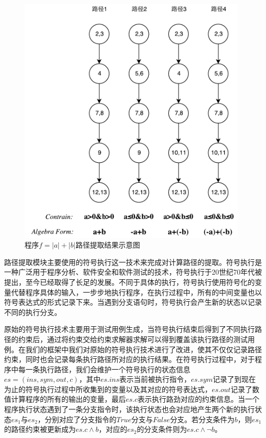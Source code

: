 \begin{figure}[thbp]
  \centering
  \includegraphics[width=110mm]{fig/ControlFlowGraphExtracted.pdf}
  \caption{程序$f=|a|+|b|$路径提取结果示意图} \label{fig:cfge}
\end{figure}

路径提取模块主要使用的符号执行这一技术来完成对计算路径的提取。符号执行是一种广泛用于程序分析、软件安全和软件测试的技术，符号执行于20世纪70年代被提出，至今已经取得了长足的发展。不同于具体的执行，符号执行使用符号化的变量代替程序具体的输入，一步步地执行程序，在执行过程中，所有的中间变量也以符号表达式的形式记录下来。当遇到分支语句时，符号执行会产生新的状态以记录不同的执行分支。

原始的符号执行技术主要用于测试用例生成，当符号执行结束后得到了不同执行路径的约束后，通过将约束交给约束求解器求解可以得到覆盖该执行路径的测试用例。在我们的框架中我们对原始的符号执行技术进行了改进，使其不仅仅记录路径约束，同时也会记录每条执行路径所对应的执行结果。在符号执行过程中，对于程序中每一条执行路径，我们会维护一个符号执行的状态信息$es=(ins, sym, out, c)$，其中$es.ins$表示当前被执行指令，$es.sym$记录了到现在为止的符号执行过程中所收集到的变量以及其对应的符号表达式，$es.out$记录了数值计算程序的所有的输出的变量，最后$es.c$表示执行路劲对应的约束信息。当一个程序执行状态遇到了一条分支指令时，该执行状态也会对应地产生两个新的执行状态$es_1$与$es_2$，分别对应了分支指令的$True$分支与$False$分支。若分支条件为$b$，则$es_1$的路径约束被更新成为$es.c \wedge b$，对应的$es_2$的分支条件则为$es.c \wedge \neg b$。

